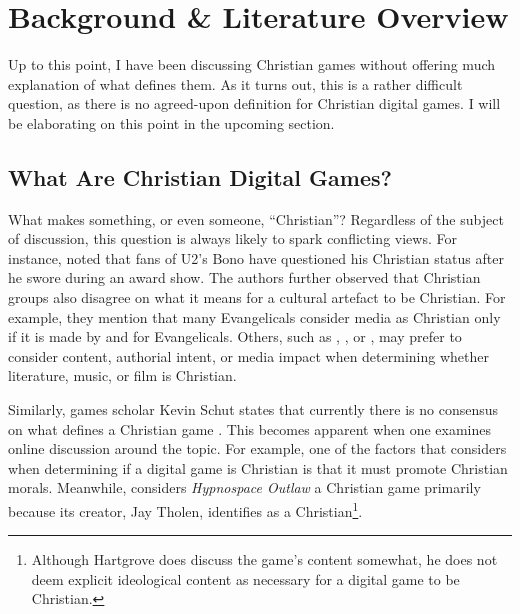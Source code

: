 \chapter{Background \& Literature Overview} \label{ch:literature_review}


Up to this point, I have been discussing Christian games without offering much explanation of what defines them. As it turns out, this is a rather difficult question, as there is no agreed-upon definition for Christian digital games. I will be elaborating on this point in the upcoming section.

\section{What Are Christian Digital Games?} \label{sec:what_are_christian_digital_games?}

What makes something, or even someone, ``Christian''? Regardless of the subject of discussion, this question is always likely to spark conflicting views. For instance, \textcite{schultze_getting_2008} noted that fans of U2's Bono have questioned his Christian status after he swore during an award show. The authors further observed that Christian groups also disagree on what it means for a cultural artefact to be Christian. For example, they mention that many Evangelicals consider media as Christian only if it is made by and for Evangelicals. Others, such as \textcite{lawton_what_2021}, \textcite{macinnis_what_2025}, or \textcite{unthank_what_2023}, may prefer to consider content, authorial intent, or media impact when determining whether literature, music, or film is Christian.

Similarly, games scholar Kevin Schut states that currently there is no consensus on what defines a Christian game \parencite[8:38]{faith_forms_problem_2024}. This becomes apparent when one examines online discussion around the topic. For example, one of the factors that \textcite{moon_channel_why_2023} considers when determining if a digital game is Christian is that it must promote Christian morals. Meanwhile, \textcite{hartgrove_why_2022} considers \textit{Hypnospace Outlaw} \parencite{tholen_hypnospace_2019} a Christian game primarily because its creator, Jay Tholen, identifies as a Christian\footnote{Although Hartgrove does discuss the game's content somewhat, he does not deem explicit ideological content as necessary for a digital game to be Christian.}.

